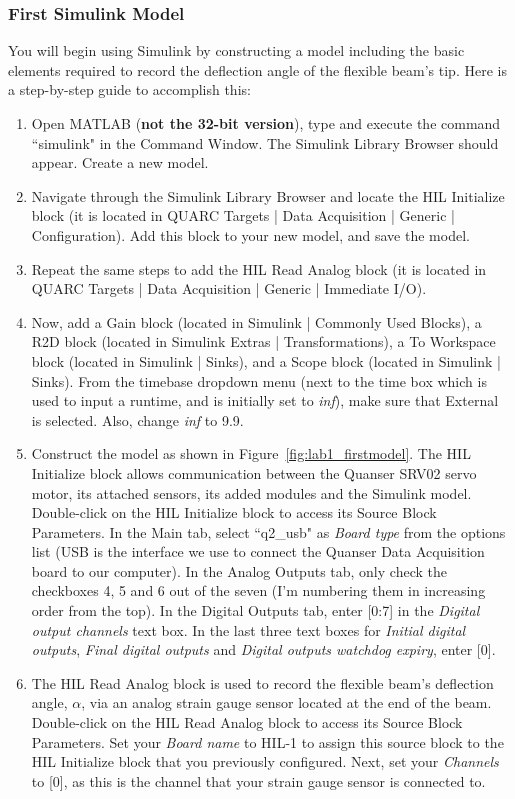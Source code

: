 \documentclass[12pt]{report}
\begin{document}
\subsubsection{First Simulink Model}\label{lab1_first_model}
You will begin using Simulink by constructing a model including the basic elements required to record the deflection angle of the flexible beam's tip. Here is a step-by-step guide to accomplish this:
\begin{enumerate}
    \item Open MATLAB (\textbf{not the 32-bit version}), type and execute the command ``simulink" in the Command Window. The Simulink Library Browser should appear. Create a new model.
    \item Navigate through the Simulink Library Browser and locate the HIL Initialize block (it is located in QUARC Targets | Data Acquisition | Generic | Configuration). Add this block to your new model, and save the model.
    \item Repeat the same steps to add the HIL Read Analog block (it is located in QUARC Targets | Data Acquisition | Generic | Immediate I/O).
    \item Now, add a Gain block (located in Simulink | Commonly Used Blocks), a R2D block (located in Simulink Extras | Transformations), a To Workspace block (located in Simulink | Sinks), and a Scope block (located in Simulink | Sinks). From the timebase dropdown menu (next to the time box which is used to input a runtime, and is initially set to \emph{inf}), make sure that External is selected. Also, change \emph{inf} to 9.9.
    \item Construct the model as shown in Figure~\ref{fig:lab1_firstmodel}. The HIL Initialize block allows communication between the Quanser SRV02 servo motor, its attached sensors, its added modules and the Simulink model. Double-click on the HIL Initialize block to access its Source Block Parameters. In the Main tab, select ``q2\_usb" as \emph{Board type} from the options list (USB is the interface we use to connect the Quanser Data Acquisition board to our computer). In the Analog Outputs tab, only check the checkboxes 4, 5 and 6 out of the seven (I'm numbering them in increasing order from the top). In the Digital Outputs tab, enter [0:7] in the \emph{Digital output channels} text box. In the last three text boxes for \emph{Initial digital outputs}, \emph{Final digital outputs} and \emph{Digital outputs watchdog expiry}, enter [0].
    \item The HIL Read Analog block is used to record the flexible beam's deflection angle, $\alpha$, via an analog strain gauge sensor located at the end of the beam. Double-click on the HIL Read Analog block to access its Source Block Parameters. Set your \emph{Board name} to HIL-1 to assign this source block to the HIL Initialize block that you previously configured. Next, set your \emph{Channels} to [0], as this is the channel that your strain gauge sensor is connected to.

\end{enumerate}
\end{document}
